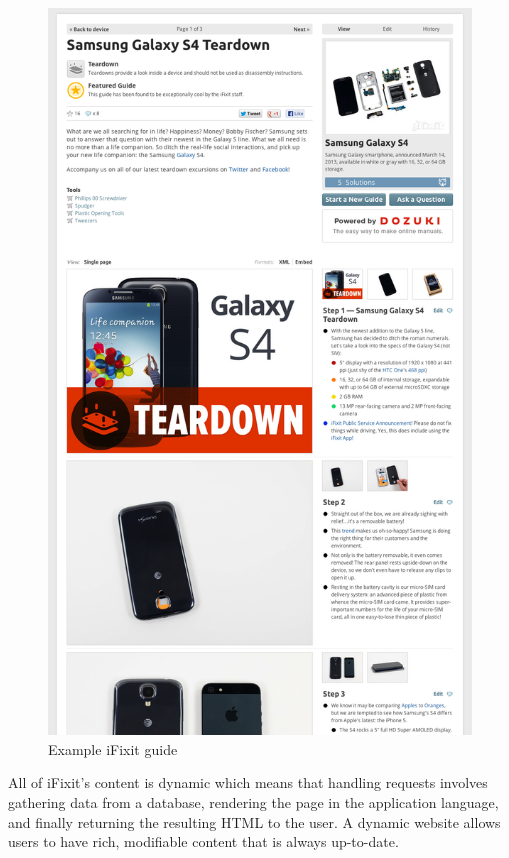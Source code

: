 \documentclass[12pt]{ucthesis}
\begin{document}
\begin{figure}[hbtp]
\centering
\includegraphics[width=\textwidth,height=0.95\textheight]{assets/iFixitGuideExample.png}
\caption{Example iFixit guide}
\label{fig:iFixitGuideExample}
\end{figure}

All of \textsf{iFixit}'s content is dynamic which means that handling requests involves gathering data from a database, rendering the page in the application language, and finally returning the resulting HTML to the user.
A dynamic website allows users to have rich, modifiable content that is always up-to-date.
\end{document}
